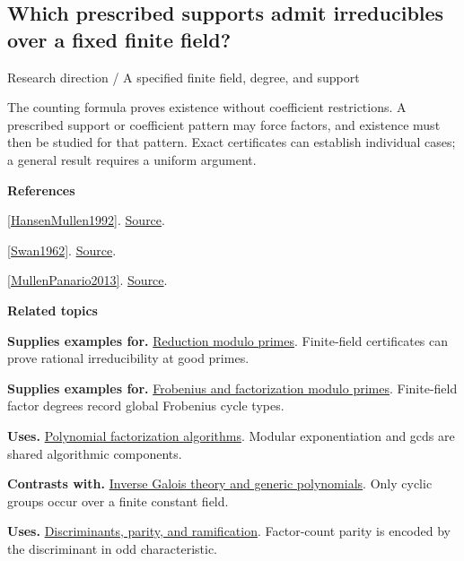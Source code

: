 \documentclass[11pt,a4paper,oneside,openany]{book}
\newenvironment{sources}{\par\smallskip\begingroup\footnotesize\color{atlasgray}\leftskip=10pt\setlength{\parskip}{2pt}}{\par\endgroup\smallskip}
\begin{document}
\subsection*{Which prescribed supports admit irreducibles over a fixed finite field?}
{\small\sffamily\color{atlasgold}Research direction / A specified finite field, degree, and support}\par\smallskip
\color{black} The counting formula proves existence without coefficient restrictions. A prescribed support or coefficient pattern may force factors, and existence must then be studied for that pattern. Exact certificates can establish individual cases; a general result requires a uniform argument.\par
\begin{sources}
\textbf{References}\par\smallskip
\noindent\hyperlink{ref:HansenMullen1992}{[HansenMullen1992]}.  \href{https://doi.org/10.1090/S0025-5718-1992-1134730-7}{Source}.\par
\noindent\hyperlink{ref:Swan1962}{[Swan1962]}.  \href{https://msp.org/pjm/1962/12-3/pjm-v12-n3-p27-p.pdf}{Source}.\par
\noindent\hyperlink{ref:MullenPanario2013}{[MullenPanario2013]}.  \href{https://doi.org/10.1201/b15006}{Source}.\par
\end{sources}\color{black}
\par\medskip\begingroup\footnotesize\setlength{\parskip}{1pt}\textbf{\sffamily\color{atlasgreen}Related topics}\par
\color{black}\textbf{Supplies examples for.} \hyperlink{article:modular-irreducibility}{Reduction modulo primes}. Finite-field certificates can prove rational irreducibility at good primes.\par
\color{black}\textbf{Supplies examples for.} \hyperlink{article:frobenius}{Frobenius and factorization modulo primes}. Finite-field factor degrees record global Frobenius cycle types.\par
\color{black}\textbf{Uses.} \hyperlink{article:factorization-algorithms}{Polynomial factorization algorithms}. Modular exponentiation and gcds are shared algorithmic components.\par
\color{black}\textbf{Contrasts with.} \hyperlink{article:inverse-galois}{Inverse Galois theory and generic polynomials}. Only cyclic groups occur over a finite constant field.\par
\color{black}\textbf{Uses.} \hyperlink{article:discriminants}{Discriminants, parity, and ramification}. Factor-count parity is encoded by the discriminant in odd characteristic.\par
\endgroup
\end{document}
